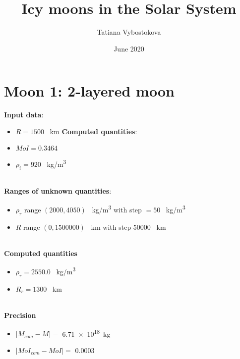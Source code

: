 \documentclass{article}
\title{Icy moons in the Solar System}
\author{Tatiana Vybostokova }
\date{June 2020}
\begin{document}
\maketitle

\section*{Moon 1: 2-layered moon}
\textbf{Input data}:
\begin{itemize}
    \item $R = 1500$ \SI{}{km}
\textbf{Computed quantities}:
    \item $MoI = 0.3464$
    \item $\rho_i = 920$ \SI{}{kg/m^3}
\end{itemize}
\\
\textbf{Ranges of unknown quantities}:
\begin{itemize}
    \item $\rho_r$ range $(2000,4050)$ \SI{}{kg/m^3} with step $=50$ \SI{}{kg/m^3}
    \item $R$ range $(0,1500000)$ \SI{}{km} with step $50000$ \SI{}{km}
\end{itemize}
\\
\textbf{Computed quantities}
    \begin{itemize}
        \item $\rho_r = 2550.0$ \SI{}{kg/m^3}
        \item $R_r = 1300$ \SI{}{km}
    \end{itemize}
\\
\textbf{Precision}
\begin{itemize}
    \item $|M_{com}-M| =$ \num{6.71e+18}\SI{}{kg}
    \item $|MoI_{com}-MoI| =$ \num{0.0003}
\end{itemize}

   
\end{document}
